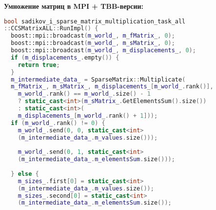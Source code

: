 \documentclass[12pt]{article}
\begin{document}
\textbf{Умножение матриц в MPI + TBB-версии:}
\begin{lstlisting}[language=C++]
bool sadikov_i_sparse_matrix_multiplication_task_all
::CCSMatrixALL::RunImpl() {
  boost::mpi::broadcast(m_world_, m_fMatrix_, 0);
  boost::mpi::broadcast(m_world_, m_sMatrix_, 0);
  boost::mpi::broadcast(m_world_, m_displacements_, 0);
  if (m_displacements_.empty()) {
    return true;
  }
  m_intermediate_data_ = SparseMatrix::Multiplicate(
  m_fMatrix_, m_sMatrix_, m_displacements_[m_world_.rank()],
    m_world_.rank() == m_world_.size() - 1
    ? static_cast<int>(m_sMatrix_.GetElementsSum().size())
    : static_cast<int>(
    m_displacements_[m_world_.rank() + 1]));
  if (m_world_.rank() != 0) {
    m_world_.send(0, 0, static_cast<int>
    (m_intermediate_data_.m_values.size()));
    
    m_world_.send(0, 1, static_cast<int>
    (m_intermediate_data_.m_elementsSum.size()));
    
  } else {
    m_sizes_.first[0] = static_cast<int>
    (m_intermediate_data_.m_values.size());
    m_sizes_.second[0] = static_cast<int>
    (m_intermediate_data_.m_elementsSum.size());


\end{lstlisting}
\end{document}
